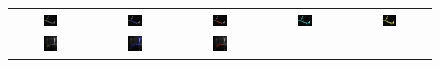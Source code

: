 \begin{figure}[t]
\begin{tabular}{@{}ccccc@{}}
\\
\includegraphics[width=0.19\textwidth]{images/L2S_compare_region/n13_orig}	&
\includegraphics[width=0.19\textwidth]{images/L2S_compare_region/n13_CV}	&
\includegraphics[width=0.19\textwidth]{images/L2S_compare_region/n13_Lankton} &
\includegraphics[width=0.19\textwidth]{images/L2S_compare_region/n13_Li}	&
\includegraphics[width=0.19\textwidth]{images/L2S_compare_region/n13_ours}	
\\
\includegraphics[width=0.19\textwidth]{images/L2S_compare_region/neuron_clear_orig}	&
\includegraphics[width=0.19\textwidth]{images/L2S_compare_region/neuron_clear_CV}	&
\includegraphics[width=0.19\textwidth]{images/L2S_compare_region/neuron_clear_Lankton} &

\end{tabular}
\end{figure}
